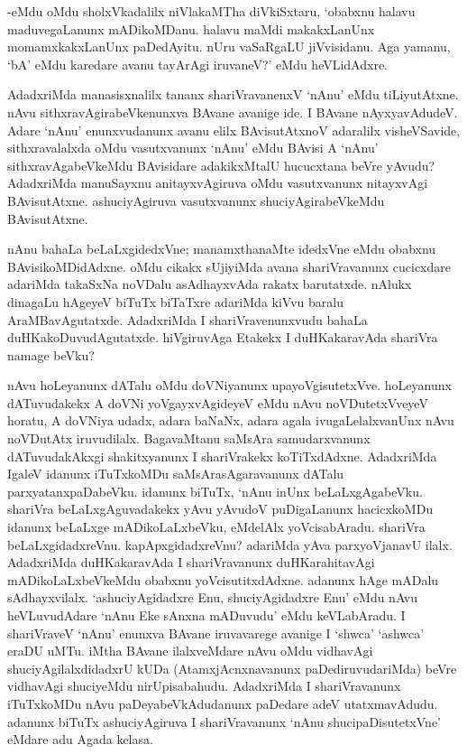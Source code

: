 -eMdu oMdu sholxVkadalilx niVlakaMTha diVkiSxtaru, `obabxnu halavu maduvegaLanunx mADikoMDanu. halavu maMdi makakxLanUnx momamxkakxLanUnx paDedAyitu. nUru vaSaRgaLU jiVvisidanu. Aga yamanu, `bA' eMdu karedare avanu tayArAgi iruvaneV?' eMdu heVLidAdxre.

AdadxriMda manasisxnalilx tananx shariVravanenxV `nAnu' eMdu tiLiyutAtxne. nAvu sithxravAgirabeVkenunxva BAvane avanige ide. I BAvane nAyxyavAdudeV. Adare `nAnu' enunxvudanunx avanu elilx BAvisutAtxnoV adaralilx visheVSavide, sithxravalalxda oMdu vasutxvanunx `nAnu' eMdu BAvisi A `nAnu' sithxravAgabeVkeMdu BAvisidare adakikxMtalU hucucxtana beVre yAvudu? AdadxriMda manuSayxnu anitayxvAgiruva oMdu vasutxvanunx nitayxvAgi BAvisutAtxne. ashuciyAgiruva vasutxvanunx shuciyAgirabeVkeMdu BAvisutAtxne.

nAnu bahaLa beLaLxgidedxVne; manamxthanaMte idedxVne eMdu obabxnu BAvisikoMDidAdxne. oMdu cikakx sUjiyiMda avana shariVravanunx cucicxdare adariMda takaSxNa noVDalu asAdhayxvAda rakatx barutatxde. nAlukx dinagaLu hAgeyeV biTuTx biTaTxre adariMda kiVvu baralu AraMBavAgutatxde. AdadxriMda I shariVravenunxvudu bahaLa duHKakoDuvudAgutatxde. hiVgiruvAga Etakekx I duHKakaravAda shariVra namage beVku?

nAvu hoLeyanunx dATalu oMdu doVNiyanunx upayoVgisutetxVve. hoLeyanunx dATuvudakekx A doVNi yoVgayxvAgideyeV eMdu nAvu noVDutetxVveyeV horatu, A doVNiya udadx, adara baNaNx, adara agala ivugaLelalxvanUnx nAvu noVDutAtx iruvudilalx. BagavaMtanu saMsAra samudarxvanunx dATuvudakAkxgi shakitxyanunx I shariVrakekx koTiTxdAdxne. AdadxriMda IgaleV idanunx iTuTxkoMDu saMsArasAgaravanunx dATalu parxyatanxpaDabeVku. idanunx biTuTx, `nAnu inUnx beLaLxgAgabeVku. shariVra beLaLxgAguvadakekx yAvu yAvudoV puDigaLanunx hacicxkoMDu idanunx beLaLxge mADikoLaLxbeVku, eMdelAlx yoVcisabAradu. shariVra beLaLxgidadxreVnu. kapApxgidadxreVnu? adariMda yAva parxyoVjanavU ilalx. AdadxriMda duHKakaravAda I shariVravanunx duHKarahitavAgi mADikoLaLxbeVkeMdu obabxnu yoVcisutitxdAdxne. adanunx hAge mADalu sAdhayxvilalx. `ashuciyAgidadxre Enu, shuciyAgidadxre Enu' eMdu nAvu heVLuvudAdare `nAnu Eke sAnxna mADuvudu' eMdu keVLabAradu. I shariVraveV `nAnu' enunxva BAvane iruvavarege avanige I `shwca' `ashwca' eraDU uMTu. iMtha BAvane ilalxveMdare nAvu oMdu vidhavAgi shuciyAgilalxdidadxrU kUDa (AtamxjAcnxnavanunx paDediruvudariMda) beVre vidhavAgi shuciyeMdu nirUpisabahudu. AdadxriMda I shariVravanunx iTuTxkoMDu nAvu paDeyabeVkAdudanunx paDedare adeV utatxmavAdudu. adanunx biTuTx ashuciyAgiruva I shariVravanunx `nAnu shucipaDisutetxVne' eMdare adu Agada kelasa.


